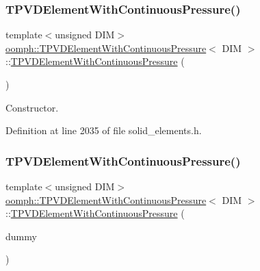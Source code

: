 \subsubsection{\texorpdfstring{T\+P\+V\+D\+Element\+With\+Continuous\+Pressure()}{TPVDElementWithContinuousPressure()}\hspace{0.1cm}{\footnotesize\ttfamily [1/2]}}
{\footnotesize\ttfamily template$<$unsigned D\+IM$>$ \\
\hyperlink{classoomph_1_1TPVDElementWithContinuousPressure}{oomph\+::\+T\+P\+V\+D\+Element\+With\+Continuous\+Pressure}$<$ D\+IM $>$\+::\hyperlink{classoomph_1_1TPVDElementWithContinuousPressure}{T\+P\+V\+D\+Element\+With\+Continuous\+Pressure} (\begin{DoxyParamCaption}{ }\end{DoxyParamCaption})\hspace{0.3cm}{\ttfamily [inline]}}



Constructor. 



Definition at line 2035 of file solid\+\_\+elements.\+h.

\mbox{\label{classoomph_1_1TPVDElementWithContinuousPressure_ab17219ca199556bee57f0b467147d263}} 
\subsubsection{\texorpdfstring{T\+P\+V\+D\+Element\+With\+Continuous\+Pressure()}{TPVDElementWithContinuousPressure()}\hspace{0.1cm}{\footnotesize\ttfamily [2/2]}}
{\footnotesize\ttfamily template$<$unsigned D\+IM$>$ \\
\hyperlink{classoomph_1_1TPVDElementWithContinuousPressure}{oomph\+::\+T\+P\+V\+D\+Element\+With\+Continuous\+Pressure}$<$ D\+IM $>$\+::\hyperlink{classoomph_1_1TPVDElementWithContinuousPressure}{T\+P\+V\+D\+Element\+With\+Continuous\+Pressure} (\begin{DoxyParamCaption}\item[{const \hyperlink{classoomph_1_1TPVDElementWithContinuousPressure}{T\+P\+V\+D\+Element\+With\+Continuous\+Pressure}$<$ D\+IM $>$ \&}]{dummy }\end{DoxyParamCaption})\hspace{0.3cm}{\ttfamily [inline]}}



